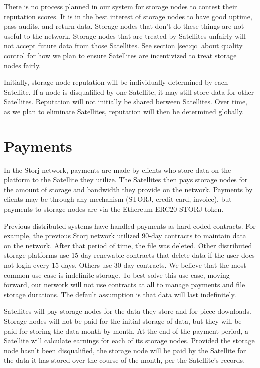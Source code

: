 \documentclass[8pt,fleqn,openany]{book}
\begin{document}
There is no process planned in our system for storage nodes to contest their
reputation scores. It is in the best interest of storage nodes to have good
uptime, pass audits, and return data. Storage nodes that don't do these things
are not useful to the network. Storage nodes that are treated by Satellites
unfairly will not accept future data from those Satellites. See section
\ref{sec:qc} about quality control for how we plan to ensure Satellites are
incentivized to treat storage nodes fairly.

Initially, storage node reputation will be individually determined by each
Satellite. If a node is disqualified by one Satellite, it may still
store data for other Satellites. Reputation will not initially be shared between
Satellites. Over time, as we plan to eliminate Satellites,
reputation will then be determined globally.

\section{Payments}\label{sec:concrete-payments}

In the Storj network, payments are made by clients who store data on the
platform to the Satellite they utilize.
The Satellites then pays storage nodes for the amount of storage and bandwidth
they provide on the network.
Payments by clients may be through any mechanism (STORJ, credit card, invoice),
but payments to storage nodes are via the Ethereum ERC20 \cite{erc20} STORJ
token.

Previous distributed systems have handled payments as hard-coded contracts.
For example, the previous Storj network utilized 90-day contracts to maintain
data on the network. After that period of time, the file was deleted.
Other distributed storage platforms use 15-day renewable contracts that delete
data if the user does not login every 15 days. Others use 30-day contracts.
We believe that the most common use case is indefinite storage. To best solve
this use case,
moving forward, our network will not use contracts at all to manage payments
and file storage durations. The default assumption is that data will last
indefinitely.

Satellites will pay storage nodes for the data they store
and for piece downloads.
Storage nodes will not be paid for the initial storage of data, but they
will be paid for storing the data month-by-month. At the end of the payment
period, a Satellite will calculate earnings for each of its storage nodes.
Provided the storage node hasn't been disqualified,
the storage node will be paid by the Satellite for the data it has stored
over the course of
the month, per the Satellite's records.
\end{document}
